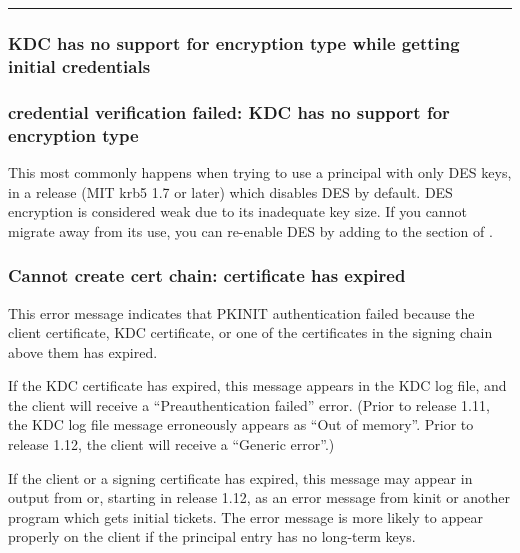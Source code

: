 \documentclass[letterpaper,10pt,english]{sphinxmanual}
\begin{document}
\bigskip\hrule\bigskip



\subsubsection{KDC has no support for encryption type while getting initial credentials}
\label{\detokenize{admin/troubleshoot:kdc-has-no-support-for-encryption-type-while-getting-initial-credentials}}\label{\detokenize{admin/troubleshoot:init-creds-etype-nosupp}}

\subsubsection{credential verification failed: KDC has no support for encryption type}
\label{\detokenize{admin/troubleshoot:credential-verification-failed-kdc-has-no-support-for-encryption-type}}\label{\detokenize{admin/troubleshoot:cert-chain-etype-nosupp}}
This most commonly happens when trying to use a principal with only
DES keys, in a release (MIT krb5 1.7 or later) which disables DES by
default.  DES encryption is considered weak due to its inadequate key
size.  If you cannot migrate away from its use, you can re-enable DES
by adding  to the {\hyperref[\detokenize{admin/conf_files/krb5_conf:libdefaults}]{}}
section of {\hyperref[\detokenize{admin/conf_files/krb5_conf:krb5-conf-5}]{}}.


\subsubsection{Cannot create cert chain: certificate has expired}
\label{\detokenize{admin/troubleshoot:cannot-create-cert-chain-certificate-has-expired}}\label{\detokenize{admin/troubleshoot:err-cert-chain-cert-expired}}
This error message indicates that PKINIT authentication failed because
the client certificate, KDC certificate, or one of the certificates in
the signing chain above them has expired.

If the KDC certificate has expired, this message appears in the KDC
log file, and the client will receive a “Preauthentication failed”
error.  (Prior to release 1.11, the KDC log file message erroneously
appears as “Out of memory”.  Prior to release 1.12, the client will
receive a “Generic error”.)

If the client or a signing certificate has expired, this message may
appear in {\hyperref[\detokenize{admin/troubleshoot:trace-logging}]{}} output from  or, starting in
release 1.12, as an error message from kinit or another program which
gets initial tickets.  The error message is more likely to appear
properly on the client if the principal entry has no long-term keys.
\end{document}
